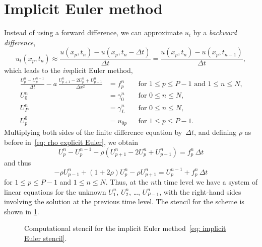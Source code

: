 \section{Implicit Euler method}

Instead of using a forward difference, we can approximate $u_t$ by a 
\emph{backward difference},
\[
u_t(x_p,t_n)\approx\frac{u(x_p,t_n)-u(x_p,t_n-\Delta t)}{\Delta t}
	=\frac{u(x_p,t_n)-u(x_p,t_{n-1})}{\Delta t},
\]
which leads to the \emph{im}plicit Euler method,
\begin{equation}\label{eq: implicit Euler 1d}
\begin{aligned}
\frac{U^n_p-U^{n-1}_p}{\Delta t}
	-a\,\frac{U^n_{p+1}-2U^n_p+U^n_{p-1}}{\Delta x^2}&=f^n_p&
&\text{for $1\le p\le P-1$ and $1\le n\le N$,}\\
U^n_0&=\gamma_0^n&&\text{for $0\le n\le N$,}\\
U^n_P&=\gamma_L^n&&\text{for $0\le n\le N$,}\\
U^0_p&=u_{0p}&&\text{for $1\le p\le P-1$.}
\end{aligned}
\end{equation}
Multiplying both sides of the finite difference equation by~$\Delta t$, and 
defining $\rho$ as before in~\eqref{eq: rho explicit Euler}, we obtain
\[
U^n_p-U^{n-1}_p-\rho(U^n_{p+1}-2U^n_p+U^n_{p-1})=f^n_p\,\Delta t
\]
and thus
\begin{equation}\label{eq: implicit Euler stencil}
-\rho U^n_{p-1}+(1+2\rho)U^n_p-\rho U^n_{p+1}=U^{n-1}_p+f^n_p\,\Delta t
\end{equation}
for $1\le p\le P-1$ and $1\le n\le N$.  Thus, at the $n$th time level we have a 
system of linear equations for the unknown $U^n_1$, $U^n_2$, \dots, $U^n_{P-1}$,
with the right-hand sides involving the solution at the previous time level.
The stencil for the scheme is shown in \cref{fig: implicit Euler stencil}.

\begin{figure}\label{fig: implicit Euler stencil}
\caption{Computational stencil for the implicit Euler 
method~\eqref{eq: implicit Euler stencil}.}
\begin{center}
\end{center}
\end{figure}

